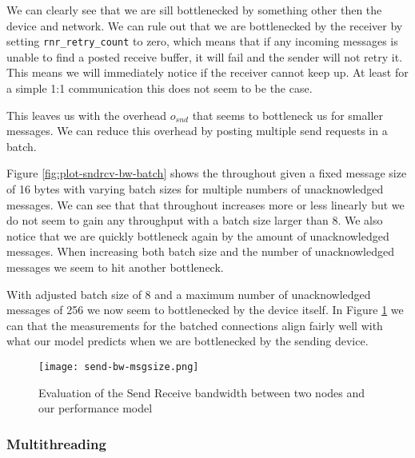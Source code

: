 
We can clearly see that we are sill bottlenecked by something other then the device and network. We can rule out that we are
bottlenecked by the receiver by setting \texttt{rnr\_retry\_count} to zero, which means that if any incoming messages is unable
to find a posted receive buffer, it will fail and the sender will not retry it. This means we will immediately notice if 
the receiver cannot keep up. At least for a simple 1:1 communication this does not seem to be the case.

This leaves us with the overhead $o_{snd}$ that seems to bottleneck us for smaller messages. We can reduce this overhead by 
posting multiple send requests in a batch. 

Figure \ref{fig:plot-sndrcv-bw-batch} shows the throughout given a fixed message size of 16 bytes with varying batch sizes for
multiple numbers of unacknowledged messages. We can see that that throughout increases more or less linearly but we do not seem
to gain any throughput with a batch size larger than 8. We also notice that we are quickly bottleneck again by the amount of 
unacknowledged messages. When increasing both batch size and the number of unacknowledged messages we seem to hit
another bottleneck.

With adjusted batch size of 8 and a maximum number of unacknowledged messages of 256 we now seem to bottlenecked by the 
device itself. In Figure \ref{fig:plot-sndrcv-bw} we can that the measurements for the batched connections align fairly 
well with what our model predicts when we are bottlenecked by the sending device. 

\begin{figure}[h]
\texttt{[image: send-bw-msgsize.png]}
\caption{Evaluation of the Send Receive bandwidth between two nodes and our performance model}
\label{fig:plot-sndrcv-bw}
\end{figure}


\subsubsection{Multithreading}

